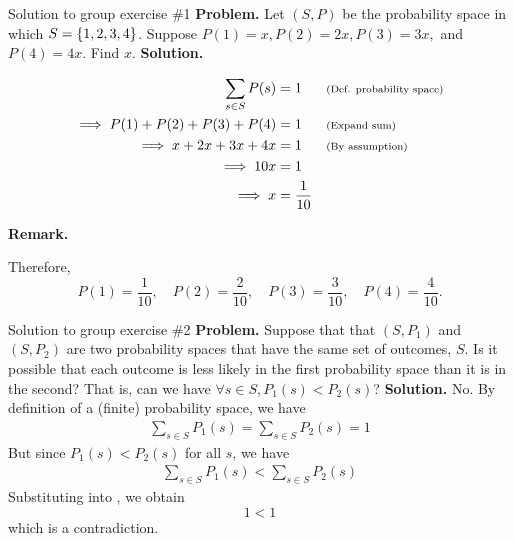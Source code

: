 \documentclass[10pt]{beamer}
\begin{document}
\begin{frame}{Solution to group exercise \#1}
\textbf{Problem.} Let $(S,P)$ be the probability space in which $S=\{ {1,2,3,4} \}$. Suppose $P(1) =x, P(2) = 2x, P(3) = 3x,$ and  $P(4)=4x$.  Find $x$.
\vfill 
\textbf{Solution.} 

\begin{align*}
\sum_{s \in S} P(s) &= 1 && \text{\scriptsize{{(Def. probability space)}}} \\
\implies P(1) + P(2) + P(3) + P(4) &=1	 && \text{\scriptsize{{(Expand sum)}}} \\
\implies x + 2x + 3x + 4x &=1	 && \text{\scriptsize{{(By assumption)}}} \\
\implies 10x &=1	 \\
\implies x &= \frac{1}{10}
\end{align*}

\vfill 
\textbf{Remark.} 

Therefore,
\[ P(1) = \frac{1}{10}, \quad  P(2) = \frac{2}{10}, \quad  P(3) = \frac{3}{10}, \quad  P(4) = \frac{4}{10}.\]



\end{frame}


\begin{frame}{Solution to group exercise \#2}
\textbf{Problem.}  Suppose that that $(S,P_1)$  and $(S,P_2)$ are two probability spaces that have the same set of outcomes, $S$.   Is it possible that each outcome is less likely in the first probability space than it is in the second?  That is, can we have $\forall s \in S, P_1(s) < P_2(s)$?
\vfill 
\textbf{Solution.}
No. By definition of a (finite) probability space, we have
%
\begin{align}
\sum_{s \in S} P_1(s) = \sum_{s \in S} P_2(s) = 1 
\label{eqn:prob_space_sums_to_one} 
\end{align}
%
But since $P_1(s) < P_2(s)$ for all $s$, we have
\begin{align}
\sum_{s \in S} P_1(s) < \sum_{s \in S} P_2(s) 
\label{eqn:P2_dominates_P1} 
\end{align}
Substituting   into  , we obtain
\[ 1 < 1 \]
which is a contradiction.

   
\end{frame}
\end{document}
